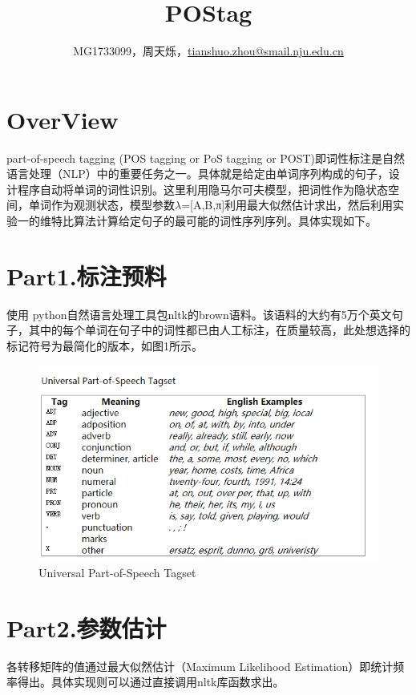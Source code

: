 \documentclass[a4paper,UTF8]{article}
\theoremstyle{definition}
\begin{document}
\title{ POStag}
\author{MG1733099，周天烁，\url{tianshuo.zhou@smail.nju.edu.cn}}
\maketitle

\section*{OverView}
    part-of-speech tagging (POS tagging or PoS tagging or POST)即词性标注是自然语言处理（NLP）中的重要任务之一。具体就是给定由单词序列构成的句子，设计程序自动将单词的词性识别。这里利用隐马尔可夫模型，把词性作为隐状态空间，单词作为观测状态，模型参数$\lambda$=[A,B,π]利用最大似然估计求出，然后利用实验一的维特比算法计算给定句子的最可能的词性序列序列。具体实现如下。
	
	
\section*{Part1.标注预料}
	使用 python自然语言处理工具包nltk的brown语料。该语料的大约有5万个英文句子，其中的每个单词在句子中的词性都已由人工标注，在质量较高，此处想选择的标记符号为最简化的版本，如图1所示。
    \begin{figure}
      \centering
      \includegraphics[width=13cm]{1.png}
      \caption{Universal Part-of-Speech Tagset}
      \label{fig:1}
    \end{figure}

\section*{Part2.参数估计}
	各转移矩阵的值通过最大似然估计（Maximum Likelihood Estimation）即统计频率得出。具体实现则可以通过直接调用nltk库函数求出。
\end{document}
